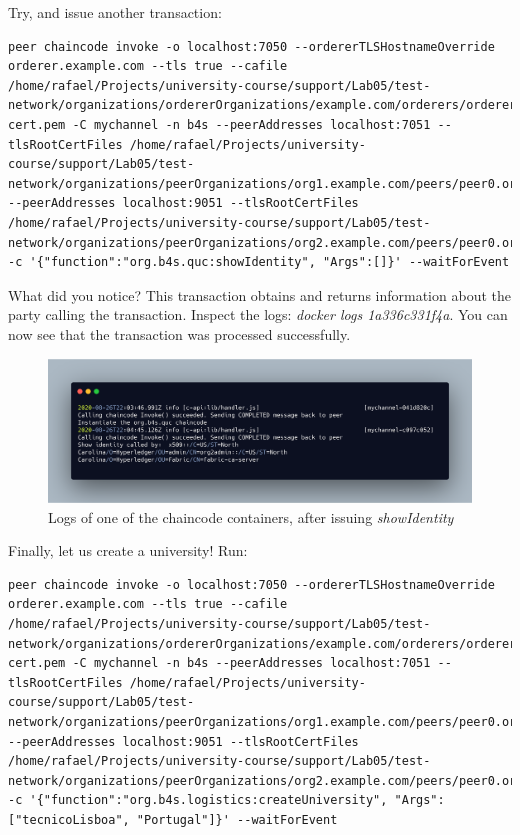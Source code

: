 \documentclass[12pt,a4paper]{article}
\theoremstyle{definition}
\begin{document}
Try, and issue another transaction:
\begin{verbatim}
peer chaincode invoke -o localhost:7050 --ordererTLSHostnameOverride orderer.example.com --tls true --cafile /home/rafael/Projects/university-course/support/Lab05/test-network/organizations/ordererOrganizations/example.com/orderers/orderer.example.com/msp/tlscacerts/tlsca.example.com-cert.pem -C mychannel -n b4s --peerAddresses localhost:7051 --tlsRootCertFiles /home/rafael/Projects/university-course/support/Lab05/test-network/organizations/peerOrganizations/org1.example.com/peers/peer0.org1.example.com/tls/ca.crt --peerAddresses localhost:9051 --tlsRootCertFiles /home/rafael/Projects/university-course/support/Lab05/test-network/organizations/peerOrganizations/org2.example.com/peers/peer0.org2.example.com/tls/ca.crt -c '{"function":"org.b4s.quc:showIdentity", "Args":[]}' --waitForEvent
\end{verbatim}

What did you notice? This transaction obtains and returns information about the party calling the transaction. Inspect the logs: \emph{docker logs 1a336c331f4a}. You can now see that the transaction was processed successfully.

\begin{figure}[h]
    \centering
    \includegraphics[scale=0.08]{figures/chaincode_response_1.png}
    \caption{Logs of one of the chaincode containers, after issuing \emph{showIdentity}}
    \label{fig:cr_1}
\end{figure}

Finally, let us create a university! Run:
\begin{verbatim}
peer chaincode invoke -o localhost:7050 --ordererTLSHostnameOverride orderer.example.com --tls true --cafile /home/rafael/Projects/university-course/support/Lab05/test-network/organizations/ordererOrganizations/example.com/orderers/orderer.example.com/msp/tlscacerts/tlsca.example.com-cert.pem -C mychannel -n b4s --peerAddresses localhost:7051 --tlsRootCertFiles /home/rafael/Projects/university-course/support/Lab05/test-network/organizations/peerOrganizations/org1.example.com/peers/peer0.org1.example.com/tls/ca.crt --peerAddresses localhost:9051 --tlsRootCertFiles /home/rafael/Projects/university-course/support/Lab05/test-network/organizations/peerOrganizations/org2.example.com/peers/peer0.org2.example.com/tls/ca.crt -c '{"function":"org.b4s.logistics:createUniversity", "Args":["tecnicoLisboa", "Portugal"]}' --waitForEvent
\end{verbatim}
\end{document}

